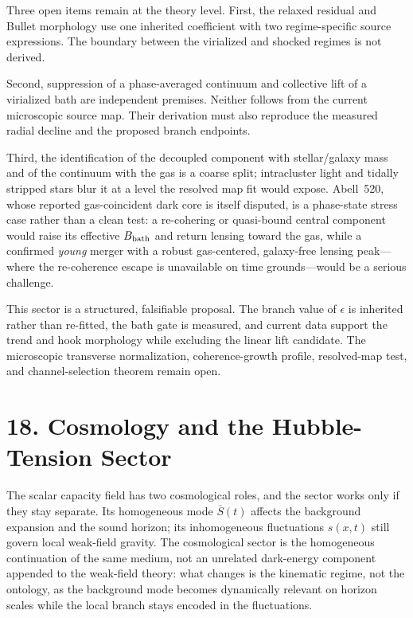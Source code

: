 \documentclass[11pt]{article}
\begin{document}
Three open items remain at the theory level. First, the relaxed residual and Bullet morphology use one inherited coefficient with two regime-specific source expressions. The boundary between the virialized and shocked regimes is not derived.

Second, suppression of a phase-averaged continuum and collective lift of a virialized bath are independent premises. Neither follows from the current microscopic source map. Their derivation must also reproduce the measured radial decline and the proposed branch endpoints.

Third, the identification of the decoupled component with stellar/galaxy mass and of the continuum with the gas is a coarse split; intracluster light and tidally stripped stars blur it at a level the resolved map fit would expose. Abell~520, whose reported gas-coincident dark core is itself disputed, is a phase-state stress case rather than a clean test: a re-cohering or quasi-bound central component would raise its effective $B_{\rm bath}$ and return lensing toward the gas, while a confirmed \emph{young} merger with a robust gas-centered, galaxy-free lensing peak---where the re-coherence escape is unavailable on time grounds---would be a serious challenge.

This sector is a structured, falsifiable proposal. The branch value of $\epsilon$ is inherited rather than re-fitted, the bath gate is measured, and current data support the trend and hook morphology while excluding the linear lift candidate. The microscopic transverse normalization, coherence-growth profile, resolved-map test, and channel-selection theorem remain open.

\section{18. Cosmology and the Hubble-Tension Sector}

The scalar capacity field has two cosmological roles, and the sector works only if they stay separate. Its homogeneous mode $\overline S(t)$ affects the background expansion and the sound horizon; its inhomogeneous fluctuations $s(x,t)$ still govern local weak-field gravity. The cosmological sector is the homogeneous continuation of the same medium, not an unrelated dark-energy component appended to the weak-field theory: what changes is the kinematic regime, not the ontology, as the background mode becomes dynamically relevant on horizon scales while the local branch stays encoded in the fluctuations.
\end{document}
